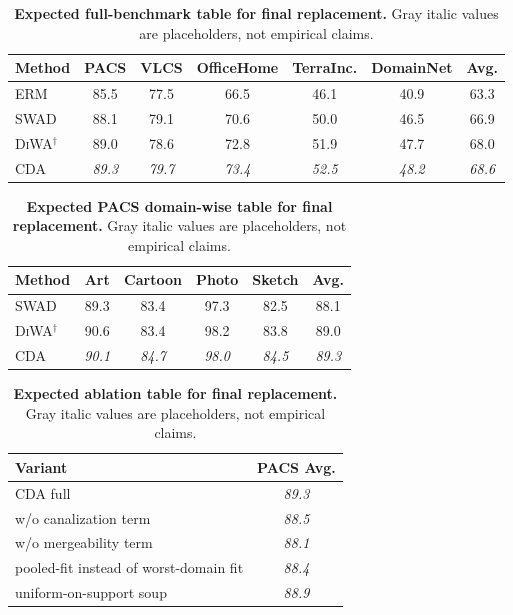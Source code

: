 \documentclass{article}
\theoremstyle{definition}
\newcommand{\Expected}[1]{\textcolor{gray!75!black}{\emph{#1}}}
\newcommand{\cda}{\textup{\textsc{CDA}}}
\newcommand{\swad}{\textup{\textsc{SWAD}}}
\newcommand{\diwa}{\textup{\textsc{DiWA}}}
\newcommand{\erm}{\textup{\textsc{ERM}}}
\begin{document}
\begin{table}[t]
    \centering
    \caption{\textbf{Expected full-benchmark table for final replacement.} Gray italic values are placeholders, not empirical claims.}
    \label{tab:expected_main}
    \begin{tabular}{lcccccc}
        \toprule
        Method & PACS & VLCS & OfficeHome & TerraInc. & DomainNet & Avg. \\
        \midrule
        \erm{} & 85.5 & 77.5 & 66.5 & 46.1 & 40.9 & 63.3 \\
        \swad{} & 88.1 & 79.1 & 70.6 & 50.0 & 46.5 & 66.9 \\
        \diwa{}\(^{\dagger}\) & 89.0 & 78.6 & 72.8 & 51.9 & 47.7 & 68.0 \\
        \cda{} & \Expected{89.3} & \Expected{79.7} & \Expected{73.4} & \Expected{52.5} & \Expected{48.2} & \Expected{68.6} \\
        \bottomrule
    \end{tabular}
\end{table}

\begin{table}[t]
    \centering
    \caption{\textbf{Expected PACS domain-wise table for final replacement.} Gray italic values are placeholders, not empirical claims.}
    \label{tab:expected_pacs}
    \begin{tabular}{lccccc}
        \toprule
        Method & Art & Cartoon & Photo & Sketch & Avg. \\
        \midrule
        \swad{} & 89.3 & 83.4 & 97.3 & 82.5 & 88.1 \\
        \diwa{}\(^{\dagger}\) & 90.6 & 83.4 & 98.2 & 83.8 & 89.0 \\
        \cda{} & \Expected{90.1} & \Expected{84.7} & \Expected{98.0} & \Expected{84.5} & \Expected{89.3} \\
        \bottomrule
    \end{tabular}
\end{table}

\begin{table}[t]
    \centering
    \caption{\textbf{Expected ablation table for final replacement.} Gray italic values are placeholders, not empirical claims.}
    \label{tab:expected_ablation}
    \begin{tabular}{lc}
        \toprule
        Variant & PACS Avg. \\
        \midrule
        \cda{} full & \Expected{89.3} \\
        w/o canalization term & \Expected{88.5} \\
        w/o mergeability term & \Expected{88.1} \\
        pooled-fit instead of worst-domain fit & \Expected{88.4} \\
        uniform-on-support soup & \Expected{88.9} \\
        \bottomrule
    \end{tabular}
\end{table}
\end{document}
